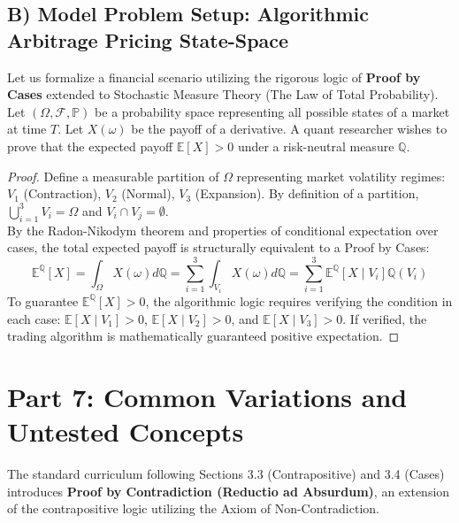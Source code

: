 \documentclass[11pt]{article}
\begin{document}
\subsection{B) Model Problem Setup: Algorithmic Arbitrage Pricing State-Space}
Let us formalize a financial scenario utilizing the rigorous logic of \textbf{Proof by Cases} extended to Stochastic Measure Theory (The Law of Total Probability). \\
Let $(\Omega, \mathcal{F}, \mathbb{P})$ be a probability space representing all possible states of a market at time $T$. Let $X(\omega)$ be the payoff of a derivative. A quant researcher wishes to prove that the expected payoff $\mathbb{E}[X] > 0$ under a risk-neutral measure $\mathbb{Q}$.
\begin{proof}
Define a measurable partition of $\Omega$ representing market volatility regimes: $V_1$ (Contraction), $V_2$ (Normal), $V_3$ (Expansion). By definition of a partition, $\bigcup_{i=1}^3 V_i = \Omega$ and $V_i \cap V_j = \emptyset$. \\
By the Radon-Nikodym theorem and properties of conditional expectation over cases, the total expected payoff is structurally equivalent to a Proof by Cases:
\[ \mathbb{E}^{\mathbb{Q}}[X] = \int_{\Omega} X(\omega) d\mathbb{Q} = \sum_{i=1}^3 \int_{V_i} X(\omega) d\mathbb{Q} = \sum_{i=1}^3 \mathbb{E}^{\mathbb{Q}}[X \mid V_i] \mathbb{Q}(V_i) \]
To guarantee $\mathbb{E}^{\mathbb{Q}}[X] > 0$, the algorithmic logic requires verifying the condition in each case: $\mathbb{E}[X \mid V_1] > 0$, $\mathbb{E}[X \mid V_2] > 0$, and $\mathbb{E}[X \mid V_3] > 0$. If verified, the trading algorithm is mathematically guaranteed positive expectation.
\end{proof}

\newpage
\section{Part 7: Common Variations and Untested Concepts}

The standard curriculum following Sections 3.3 (Contrapositive) and 3.4 (Cases) introduces \textbf{Proof by Contradiction (Reductio ad Absurdum)}, an extension of the contrapositive logic utilizing the Axiom of Non-Contradiction.
\end{document}
